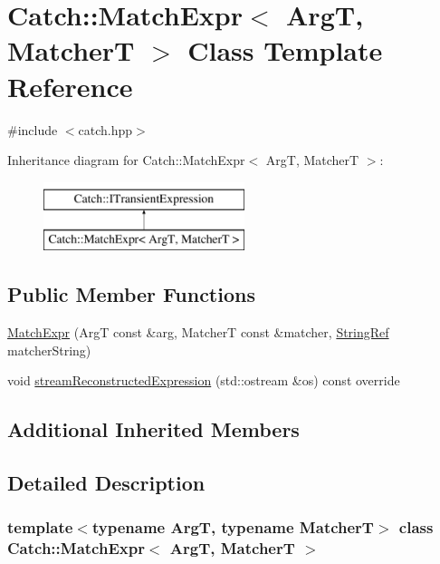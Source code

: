 \hypertarget{class_catch_1_1_match_expr}{}\section{Catch\+:\+:Match\+Expr$<$ ArgT, MatcherT $>$ Class Template Reference}
\label{class_catch_1_1_match_expr}


{\ttfamily \#include $<$catch.\+hpp$>$}

Inheritance diagram for Catch\+:\+:Match\+Expr$<$ ArgT, MatcherT $>$\+:\begin{figure}[H]
\begin{center}
\leavevmode
\includegraphics[height=2.000000cm]{class_catch_1_1_match_expr}
\end{center}
\end{figure}
\subsection*{Public Member Functions}
\begin{DoxyCompactItemize}
\item 
\mbox{\hyperlink{class_catch_1_1_match_expr_ab5b9ecc4fb9e91f5f48756e75affe93d}{Match\+Expr}} (ArgT const \&arg, MatcherT const \&matcher, \mbox{\hyperlink{class_catch_1_1_string_ref}{String\+Ref}} matcher\+String)
\item 
void \mbox{\hyperlink{class_catch_1_1_match_expr_ad3e41adb597750b2219bb37e51185629}{stream\+Reconstructed\+Expression}} (std\+::ostream \&os) const override
\end{DoxyCompactItemize}
\subsection*{Additional Inherited Members}


\subsection{Detailed Description}
\subsubsection*{template$<$typename ArgT, typename MatcherT$>$\newline
class Catch\+::\+Match\+Expr$<$ Arg\+T, Matcher\+T $>$}



